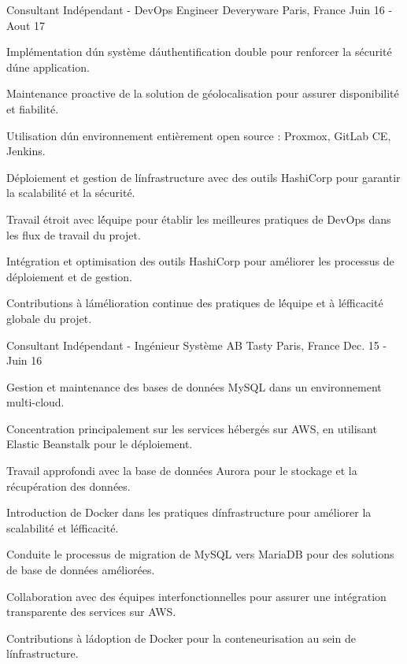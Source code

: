 \begin{cventries}
  \cventry
    {Consultant Indépendant - DevOps Engineer} %
    {Deveryware} %
    {Paris, France} %
    {Juin 16 - Aout 17} %
    {
      \begin{cvitems} %
        \item {Implémentation d\' un système d\' authentification double pour renforcer la sécurité d\' une application.}
        \item {Maintenance proactive de la solution de géolocalisation pour assurer disponibilité et fiabilité.}
        \item {Utilisation d\' un environnement entièrement open source : Proxmox, GitLab CE, Jenkins.}
        \item {Déploiement et gestion de l\' infrastructure avec des outils HashiCorp pour garantir la scalabilité et la sécurité.}
        \item {Travail étroit avec l\' équipe pour établir les meilleures pratiques de DevOps dans les flux de travail du projet.}
        \item {Intégration et optimisation des outils HashiCorp pour améliorer les processus de déploiement et de gestion.}
        \item {Contributions à l\' amélioration continue des pratiques de l\' équipe et à l\' efficacité globale du projet.}
      \end{cvitems}
    }

  \cventry
    {Consultant Indépendant - Ingénieur Système} %
    {AB Tasty} %
    {Paris, France} %
    {Dec. 15 - Juin 16} %
    {
      \begin{cvitems} %
        \item {Gestion et maintenance des bases de données MySQL dans un environnement multi-cloud.}
        \item {Concentration principalement sur les services hébergés sur AWS, en utilisant Elastic Beanstalk pour le déploiement.}
        \item {Travail approfondi avec la base de données Aurora pour le stockage et la récupération des données.}
        \item {Introduction de Docker dans les pratiques d\' infrastructure pour améliorer la scalabilité et l\' efficacité.}
        \item {Conduite le processus de migration de MySQL vers MariaDB pour des solutions de base de données améliorées.}
        \item {Collaboration avec des équipes interfonctionnelles pour assurer une intégration transparente des services sur AWS.}
        \item {Contributions à l\' adoption de Docker pour la conteneurisation au sein de l\' infrastructure.}
      \end{cvitems}
    }


\end{cventries}
